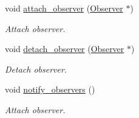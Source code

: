 \begin{DoxyCompactItemize}
\item 
void \hyperlink{classengine_1_1_game_object_a3b266846fd1c038dd0e567848060a7c3}{attach\+\_\+observer} (\hyperlink{classengine_1_1_observer}{Observer} $\ast$)
\begin{DoxyCompactList}\small\item\em Attach observer. \end{DoxyCompactList}\item 
void \hyperlink{classengine_1_1_game_object_a8cc6e4a6e7723ee74bbc35228d82b640}{detach\+\_\+observer} (\hyperlink{classengine_1_1_observer}{Observer} $\ast$)
\begin{DoxyCompactList}\small\item\em Detach observer. \end{DoxyCompactList}\item 
void \hyperlink{classengine_1_1_game_object_a0c671e93cdf2b6ba8fbe22da0be51cc2}{notify\+\_\+observers} ()
\begin{DoxyCompactList}\small\item\em Attach observer. \end{DoxyCompactList}\end{DoxyCompactItemize}
